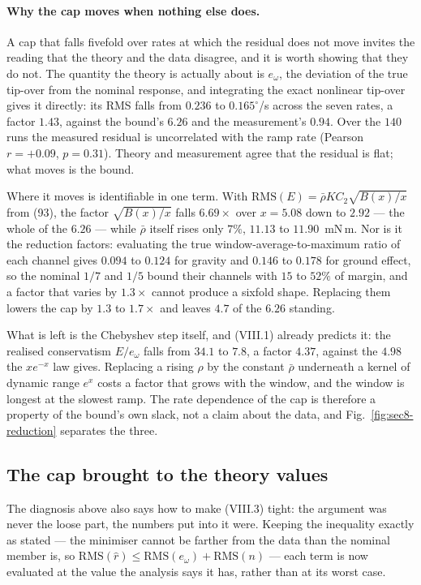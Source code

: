 \documentclass[10pt]{article}
\newcommand{\rbar}{\bar\rho}
\begin{document}
\paragraph{Why the cap moves when nothing else does.} A cap that falls
fivefold over rates at which the residual does not move invites the
reading that the theory and the data disagree, and it is worth showing
that they do not. The quantity the theory is actually about is
$e_\omega$, the deviation of the true tip-over from the nominal
response, and integrating the exact nonlinear tip-over gives it directly:
its RMS falls from $0.236$ to $0.165^\circ$/s across the seven rates, a
factor $1.43$, against the bound's $6.26$ and the measurement's $0.94$.
Over the $140$ runs the measured residual is uncorrelated with the ramp
rate (Pearson $r = +0.09$, $p = 0.31$). Theory and measurement agree that
the residual is flat; what moves is the bound.

Where it moves is identifiable in one term. With
$\mathrm{RMS}(E) = \rbar K C_2\sqrt{B(x)/x}$ from (93), the factor
$\sqrt{B(x)/x}$ falls $6.69\times$ over $x = 5.08$ down to $2.92$ ---
the whole of the $6.26$ --- while $\rbar$ itself rises only $7\%$,
$11.13$ to $11.90$~mN\,m. Nor is it the reduction factors: evaluating
the true window-average-to-maximum ratio of each channel gives
$0.094$ to $0.124$ for gravity and $0.146$ to $0.178$ for ground effect,
so the nominal $1/7$ and $1/5$ bound their channels with $15$ to $52\%$
of margin, and a factor that varies by $1.3\times$ cannot produce a
sixfold shape. Replacing them lowers the cap by $1.3$ to $1.7\times$ and
leaves $4.7$ of the $6.26$ standing.

What is left is the Chebyshev step itself, and (VIII.1) already
predicts it: the realised conservatism $E/e_\omega$ falls from $34.1$ to
$7.8$, a factor $4.37$, against the $4.98$ the $xe^{-x}$ law gives.
Replacing a rising $\rho$ by the constant $\rbar$ underneath a kernel of
dynamic range $e^{x}$ costs a factor that grows with the window, and the
window is longest at the slowest ramp. The rate dependence of the cap is
therefore a property of the bound's own slack, not a claim about the
data, and Fig.~\ref{fig:sec8-reduction} separates the three.

\subsection{The cap brought to the theory values}

The diagnosis above also says how to make (VIII.3) tight: the argument
was never the loose part, the numbers put into it were. Keeping the
inequality exactly as stated --- the minimiser cannot be farther from
the data than the nominal member is, so
$\mathrm{RMS}(\hat r)\le\mathrm{RMS}(e_\omega)+\mathrm{RMS}(n)$ ---
each term is now evaluated at the value the analysis says it has,
rather than at its worst case.
\end{document}
